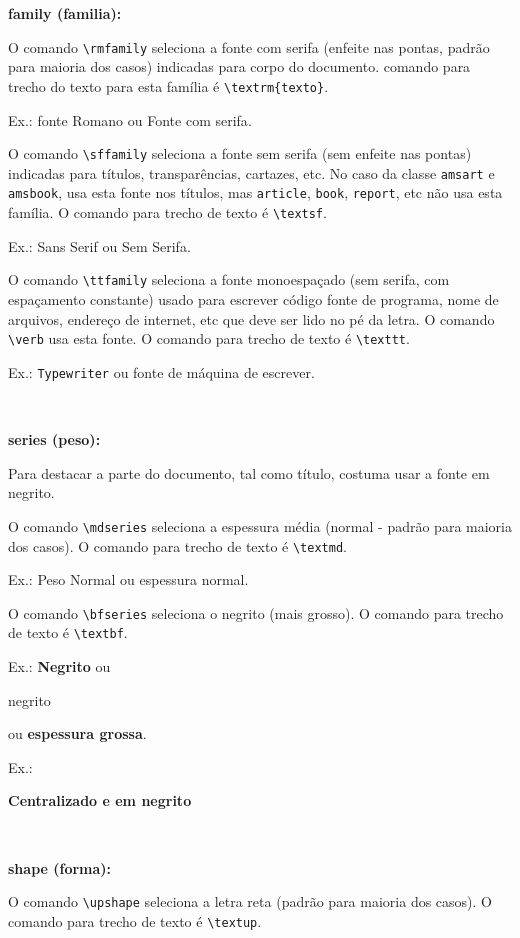 \documentclass[12pt,a4paper]{article}
\begin{document}
{\bfseries family (familia):}

O comando \verb|\rmfamily| seleciona a fonte com serifa 
(enfeite nas pontas, padrão para maioria dos casos) 
indicadas para corpo do documento. 
comando para trecho do texto para esta família é \verb+\textrm{texto}+.

Ex.: \textrm{fonte Romano} ou {\rmfamily Fonte com serifa}.

O comando \verb|\sffamily| seleciona a fonte sem serifa 
(sem enfeite nas pontas) indicadas para títulos, 
transparências, cartazes, etc. 
No caso da classe \texttt{amsart} e \texttt{amsbook}, usa esta fonte 
nos títulos, mas \texttt{article}, \texttt{book}, \texttt{report}, etc 
não usa esta família.
O comando para trecho de texto é \verb+\textsf+.

Ex.: \textsf{Sans Serif} ou {\sffamily Sem Serifa}.

O comando \verb|\ttfamily| seleciona a fonte monoespaçado (sem serifa, 
com espaçamento constante) usado para escrever código fonte de programa,
nome de arquivos, endereço de internet, etc que deve ser lido no pé da letra.
O comando \verb|\verb| usa esta fonte.
O comando para trecho de texto é \verb+\texttt+.

Ex.: \texttt{Typewriter} ou {\ttfamily fonte de máquina de escrever}.

\

{\bfseries series (peso):}

Para destacar a parte do documento, tal como título, 
costuma usar a fonte em negrito.

O comando \verb|\mdseries| seleciona a espessura média 
(normal - padrão para maioria dos casos).
O comando para trecho de texto é \verb+\textmd+.


Ex.: \textmd{Peso Normal} ou {\mdseries espessura normal}.


O comando \verb|\bfseries| seleciona o negrito (mais grosso).
O comando para trecho de texto é \verb+\textbf+.


Ex.: \textbf{Negrito} ou 
\begin{bfseries}
negrito
\end{bfseries}
ou {\bfseries espessura grossa}.

Ex.: \begin{center}
\bfseries Centralizado e em negrito
\end{center}

\

{\bfseries shape (forma):}

O comando \verb|\upshape| seleciona a letra reta (padrão para maioria dos casos).
O comando para trecho de texto é \verb+\textup+.
\end{document}
